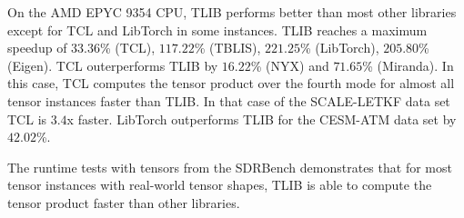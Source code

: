 On the AMD EPYC 9354 CPU, TLIB performs better than most other libraries except for TCL and LibTorch in some instances.
TLIB reaches a maximum speedup of $33.36$\% (TCL), $117.22$\% (TBLIS), $221.25$\% (LibTorch), $205.80$\% (Eigen).
TCL outerperforms TLIB by $16.22$\% (NYX) and $71.65$\% (Miranda).
In this case, TCL computes the tensor product over the fourth mode for almost all tensor instances faster than TLIB.
In that case of the SCALE-LETKF data set TCL is $3.4$x faster.
LibTorch outperforms TLIB for the CESM-ATM data set by $42.02$\%.

The runtime tests with tensors from the SDRBench demonstrates that for most tensor instances with real-world tensor shapes, TLIB is able to compute the tensor product faster than other libraries.

